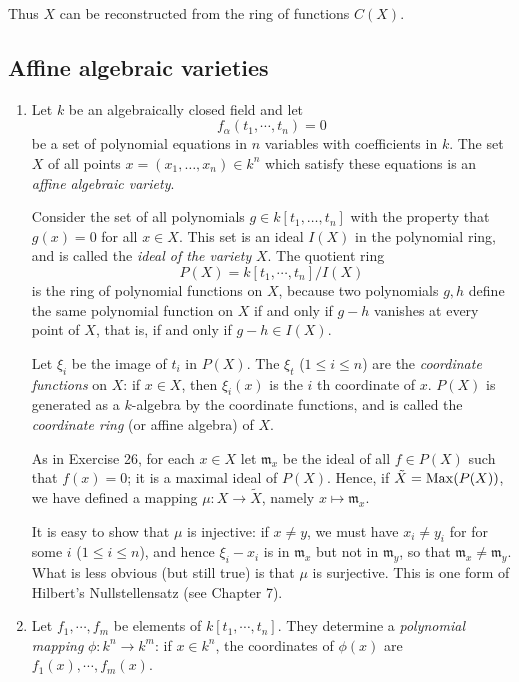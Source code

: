 \documentclass[class=book, crop=false]{standalone}
\theoremstyle{definition}
\theoremstyle{remark}
\begin{document}
\begin{enumerate}[resume*=exc1]
\begin{enumerate}[i)]
Thus $X$ can be reconstructed from the ring of functions $C(X)$.
\end{enumerate}
\end{enumerate}

\subsection*{Affine algebraic varieties}
\begin{enumerate}[resume*=exc1]
  \item Let $k$ be an algebraically closed field and let
  \[
  f_{\alpha}\left(t_{1}, \cdots, t_{n}\right)=0
\]
be a set of polynomial equations in $n$ variables with coefficients in $k$. The
set $X$ of all points $x=\left(x_{1}, \ldots, x_{n}\right) \in k^{n}$ which
satisfy these equations is an \textit{affine algebraic variety}.

Consider the set of all polynomials $g \in k\left[t_{1}, \ldots, t_{n}\right]$
with the property that $g(x)=0$ for all $x \in X$. This set is an ideal $I(X)$
in the polynomial ring, and is called the \textit{ideal of the variety} $X$. The quotient ring
\[
  P(X)=k\left[t_{1}, \cdots, t_{n}\right] / I(X)
\]
is the ring of polynomial functions on $X$, because two polynomials $g, h$
define the same polynomial function on $X$ if and only if $g-h$ vanishes at
every point of $X$, that is, if and only if $g-h \in I(X)$.

Let $\xi_{i}$ be the
image of $t_{i}$ in $P(X)$. The $\xi_{t}$ ($1 \leq i \leq n$) are the \textit{coordinate
functions} on $X$: if $x \in X$, then $\xi_{i}(x)$ is the $i$ th coordinate of
$x$. $P(X)$ is generated as a $k$-algebra by the coordinate functions, and is
called the \textit{coordinate ring} (or affine algebra) of $X$.

As in Exercise 26, for each $x \in X$ let $\mathfrak{m}_{x}$ be the ideal of all
$f \in P(X)$ such that $f(x)=0$; it is a maximal ideal of $P(X)$. Hence, if
$\tilde{X}=\operatorname{Max}(P(X))$, we have defined a mapping
$\mu: X \to \tilde{X}$, namely $x \mapsto \mathfrak{m}_{x}$.

It is easy to show that $\mu$ is injective: if $x \neq y$, we must have
$x_{i} \neq y_{i}$ for for some $i$ ($1 \leq i \leq n$), and hence $\xi_{i}-x_{i}$
is in $\mathfrak{m}_{x}$ but not in $\mathfrak{m}_{y}$, so that
$\mathfrak{m}_{x} \neq \mathfrak{m}_{y}$. What is less obvious (but still true)
is that $\mu$ is surjective. This is one form of Hilbert's Nullstellensatz (see
Chapter 7).

\item Let $f_{1}, \cdots, f_{m}$ be elements of
        $k\left[t_{1}, \cdots, t_{n}\right]$. They determine a \textit{polynomial
        mapping} $\phi: k^{n} \to k^{m}$: if $x \in k^{n}$, the coordinates of
        $\phi(x)$ are $f_{1}(x), \cdots, f_{m}(x)$.


\end{enumerate}
\end{document}
